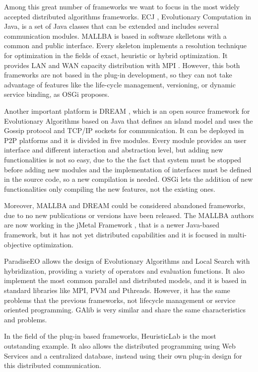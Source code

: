 \documentclass{sig-alternate}
\begin{document}
Among this great number of frameworks we want to focus in the most widely accepted distributed algorithms frameworks. ECJ \cite{ECJ}, Evolutionary Computation in Java, is a set of Java classes that can be extended and includes several communication modules. MALLBA \cite{MALLBA} is based in software skelletons with a common and public interface. Every skeleton implements a resolution technique for optimization in the fields of exact, heuristic or hybrid optimization. It provides LAN and WAN capacity distribution with MPI . However, this both frameworks are not based in the plug-in development, so they can not take advantage of features like the life-cycle management, versioning, or dynamic service binding, as OSGi proposes.




Another important platform is DREAM \cite{DREAM}, which is an open source framework for Evolutionary Algorithms based on Java that
defines an island model and uses the Gossip protocol and TCP/IP sockets for
communication. It can be deployed in P2P platforms and it is divided
in five modules. Every module provides an user interface and different
interaction and abstraction level, but adding new functionalities is not so easy, due to the the fact that system must be stopped before adding new modules and the implementation of interfaces must be defined in the source code, so a new compilation is needed. OSGi lets the addition of new functionalities only compiling the new features, not the existing ones. 

Moreover, MALLBA and DREAM could be considered abandoned frameworks, due to no new publications or versions have been released. The MALLBA authors are now working in the jMetal Framework \cite{JMETAL}, that is a newer Java-based framework, but it has not yet distributed capabilities and it is focused in multi-objective optimization.

ParadiseEO \cite{PARADISEO} allows the design of Evolutionary Algorithms and Local Search with hybridization, providing a variety of operators and evaluation functions. It also implement the most common parallel and distributed models, and it is based in standard libraries like MPI, PVM and Pthreads. However, it has the same problems that the previous frameworks, not lifecycle management or service oriented programming. GAlib \cite{GALIB} is very similar and share the same characteristics and problems.

In the field of the plug-in based frameworks, HeuristicLab \cite{HEURISTICLAB} is the most outstanding example. It also allows the distributed programming using Web Services and a centralized database, instead using their own plug-in design for this distributed communication.
\end{document}

